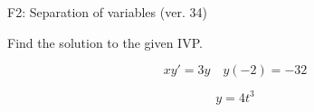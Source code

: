 \begin{exercise}
  \begin{exerciseTitle}F2: Separation of variables (ver. 34)\end{exerciseTitle}
  \begin{exerciseStatement}
    
Find the solution to the given IVP.

    
\[xy'= 3 y \hspace{1em} y( -2 ) = -32\]

  \end{exerciseStatement}
  \begin{exerciseAnswer}
    
\[y= 4 t^ 3\]

  \end{exerciseAnswer}
\end{exercise}